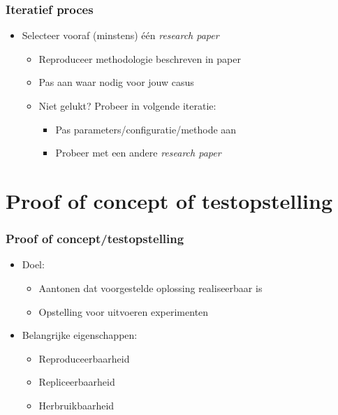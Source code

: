 \documentclass[aspectratio=169]{beamer}
\begin{document}
\begin{frame}
  \frametitle{Iteratief proces}

  \begin{itemize}
  \item Selecteer vooraf (minstens) één \textit{research paper}

    \begin{itemize}
      \item Reproduceer methodologie beschreven in paper
      \item Pas aan waar nodig voor jouw casus
      \item Niet gelukt? Probeer in volgende iteratie:
      \begin{itemize}
        \item Pas parameters/configuratie/methode aan
        \item Probeer met een andere \textit{research paper}
      \end{itemize} 
    \end{itemize}
    
  \end{itemize}


\end{frame}

\section{Proof of concept of testopstelling}

\begin{frame}
  \frametitle{Proof of concept/testopstelling}

  \begin{itemize}
    \item Doel:
          \begin{itemize}
            \item Aantonen dat voorgestelde oplossing realiseerbaar is
            \item Opstelling voor uitvoeren experimenten
          \end{itemize}
    \item Belangrijke eigenschappen:
          \begin{itemize}
            \item Reproduceerbaarheid
            \item Repliceerbaarheid
            \item Herbruikbaarheid
          \end{itemize}
  \end{itemize}

  \medskip

\end{frame}
\end{document}

